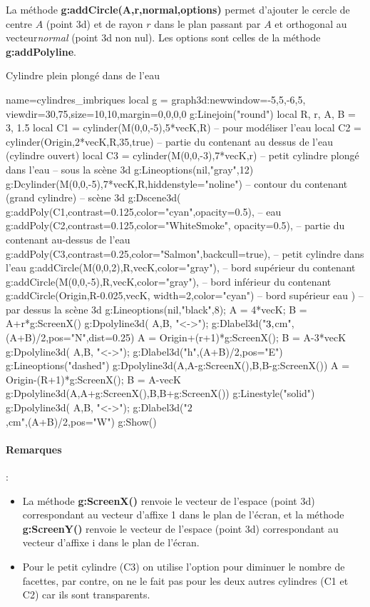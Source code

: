 La méthode \textbf{g:addCircle(A,r,normal,options)} permet d'ajouter le cercle de centre $A$ (point 3d) et de rayon $r$ dans le plan passant par $A$ et orthogonal au vecteur\emph{normal} (point 3d non nul). Les options sont celles de la méthode \textbf{g:addPolyline}.

\begin{demo}{Cylindre plein plongé dans de l'eau}
\begin{luadraw}{name=cylindres_imbriques}
local g = graph3d:new{window={-5,5,-6,5}, viewdir={30,75},size={10,10},margin={0,0,0,0}}
g:Linejoin("round")
local R, r, A, B = 3, 1.5
local C1 = cylinder(M(0,0,-5),5*vecK,R)  -- pour modéliser l'eau
local C2 = cylinder(Origin,2*vecK,R,35,true) -- partie du contenant au dessus de l'eau (cylindre ouvert)
local C3 = cylinder(M(0,0,-3),7*vecK,r) -- petit cylindre plongé dans l'eau
-- sous la scène 3d
g:Lineoptions(nil,"gray",12)
g:Dcylinder(M(0,0,-5),7*vecK,R,{hiddenstyle="noline"}) -- contour du contenant (grand cylindre)
-- scène 3d
g:Dscene3d(
        g:addPoly(C1,{contrast=0.125,color="cyan",opacity=0.5}), -- eau
        g:addPoly(C2,{contrast=0.125,color="WhiteSmoke", opacity=0.5}), -- partie du contenant au-dessus de l'eau
        g:addPoly(C3,{contrast=0.25,color="Salmon",backcull=true}), -- petit cylindre dans l'eau
        g:addCircle(M(0,0,2),R,vecK,{color="gray"}), -- bord supérieur du contenant
        g:addCircle(M(0,0,-5),R,vecK,{color="gray"}), -- bord inférieur du contenant        
        g:addCircle(Origin,R-0.025,vecK, {width=2,color="cyan"}) -- bord supérieur eau
        )
-- par dessus la scène 3d
g:Lineoptions(nil,"black",8); A = 4*vecK; B = A+r*g:ScreenX()
g:Dpolyline3d( {A,B}, "<->"); g:Dlabel3d("$3\\,$cm",(A+B)/2,{pos="N",dist=0.25})
A = Origin+(r+1)*g:ScreenX(); B = A-3*vecK
g:Dpolyline3d( {A,B}, "<->"); g:Dlabel3d("h",(A+B)/2,{pos="E"})
g:Lineoptions("dashed")
g:Dpolyline3d({{A,A-g:ScreenX()},{B,B-g:ScreenX()}})
A = Origin-(R+1)*g:ScreenX(); B = A-vecK
g:Dpolyline3d({{A,A+g:ScreenX()},{B,B+g:ScreenX()}})
g:Linestyle("solid")
g:Dpolyline3d( {A,B}, "<->"); g:Dlabel3d("$2$\\,cm",(A+B)/2,{pos="W"})
g:Show()
\end{luadraw}
\end{demo}

\paragraph{Remarques} : 
\begin{itemize}
    \item La méthode \textbf{g:ScreenX()} renvoie le vecteur de l'espace (point 3d) correspondant au vecteur d'affixe 1 dans le plan de l'écran, et la méthode \textbf{g:ScreenY()} renvoie le vecteur de l'espace (point 3d) correspondant au vecteur d'affixe i dans le plan de l'écran.
    \item Pour le petit cylindre (C3) on utilise l'option  pour diminuer le nombre de facettes, par contre, on ne le fait pas pour les deux autres cylindres (C1 et C2) car ils sont transparents.
\end{itemize}

